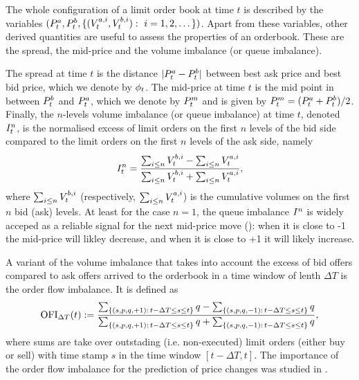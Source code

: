 \documentclass[10pt, article,table]{article}
\begin{document}
The whole configuration of a limit order book at time $t$ is described by the variables $(\bestAskPrice_t, \bestBidPrice_t, \lbrace (\nthBestAskVolume[i]_t, \nthBestBidVolume[i]_t) : \, \, i=1,2,\dots\rbrace)$. Apart from these variables, other derived quantities are useful to assess the properties of an orderbook. These are the spread, the mid-price and the volume imbalance (or queue imbalance). 

The spread at time $t$ is the distance $\lvert \bestAskPrice_t - \bestBidPrice_t \rvert$ between best ask price  and best bid price, which we denote by $\LOBspread_t$.  The mid-price at time $t$ is the mid point in between  $\bestBidPrice_t$ and $\bestAskPrice_{t}$, which we denote by $\price^{m}_t$ and is given by $\price^m_t = (\bestAskPrice_t + \bestBidPrice_{t})/{2}$.
Finally, the $n$-levels volume imbalance (or queue imbalance) at time $t$, denoted $\volumeImbalance^{n}_t$, is the normalised excess of limit orders on the first $n$ levels of the bid side compared to the limit orders on the first $n$ levels of the ask side, namely
\begin{equation}\label{eq.definition_volume_imbalance}
\volumeImbalance^{n}_t =
\frac{\sum_{i\leq n}\nthBestBidVolume[i]_t - \sum_{i\leq n}\nthBestAskVolume[i]_t}{\sum_{i\leq n}\nthBestBidVolume[i]_t + \sum_{i\leq n}\nthBestAskVolume[i]_t},
\end{equation}
where $\sum_{i\leq n}\nthBestBidVolume[i]_t$ (respectively, $\sum_{i\leq n}\nthBestAskVolume[i]_t$) is the cumulative volumes on the first $n$ bid (ask) levels. 
At least for the case $n=1$, the queue imbalance $\volumeImbalance^n$ is widely acceped as a reliable signal for the next mid-price move (\citealp{CDJ18enh}): when it is close to -1 the mid-price will likley decrease, and when it is close to +1 it will likely increase. 

A variant of the volume imbalance that takes into account the excess of bid offers compared to ask offers arrived to the orderbook in a time window of lenth $\Delta T$ is the order flow imbalance. It is defined as 
\begin{equation*}
 \OFI_{\Delta T}(t) : = \frac{\sum_{\lbrace (s,p,q,+1): \, t-\Delta T \leq s \leq t \rbrace} q -  \sum_{\lbrace (s,p,q,-1): \, t-\Delta T \leq s \leq t \rbrace} q}{\sum_{\lbrace (s,p,q,+1): \, t-\Delta T \leq s \leq t \rbrace} q +  \sum_{\lbrace (s,p,q,-1): \, t-\Delta T \leq s \leq t \rbrace} q},
\end{equation*}
where sums are take over outstading (i.e. non-executed) limit orders (either buy or sell) with time stamp $s$ in the time window $[t-\Delta T, t]$. The importance of the order flow imbalance for the prediction of price changes was studied in \citealp{CKS14pri}.
\end{document}
